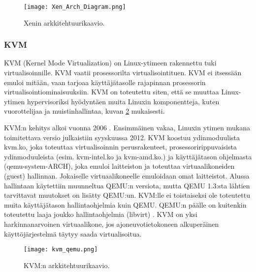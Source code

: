 
\begin{figure}[H]
\centering
\texttt{[image: Xen\_Arch\_Diagram.png]}
\caption{Xenin arkkitehtuurikaavio\cite{xen_overview}.}
\label{kuva_xen}
\end{figure}

\subsubsection{KVM}
KVM (Kernel Mode Virtualization) on Linux-ytimeen rakennettu tuki virtualisoinnille. KVM vaatii prosessorilta virtualisointituen. KVM ei itsessään emuloi mitään, vaan tarjoaa käyttäjätasolle rajapinnan prosessorin virtualisointiominaisuuksiin. KVM on toteutettu siten, että se muuttaa Linux-ytimen hypervisoriksi hyödyntäen muita Linuxin komponentteja, kuten vuorottelijaa ja muistinhallintaa, kuvan \ref{kuva_kvm} mukaisesti. \citep{kvm1}

KVM:n kehitys alkoi vuonna 2006 \cite{kvm3}. Ensimmäinen vakaa, Linuxin ytimen mukana toimitettava versio julkaistiin syyskuussa 2012. KVM koostuu ydinmoduulista kvm.ko, joka toteuttaa virtualisoinnin perusrakenteet, prosessoririppuvaisista ydinmoduuleista (esim. kvm-intel.ko ja kvm-amd.ko.) ja käyttäjätason ohjelmasta (qemu-system-ARCH), joka emuloi laitteiston ja toteuttaa virtuaalikoneiden (guest) hallinnan. Jokaiselle virtuaalikoneelle emuloidaan omat laitteistot. Alussa hallintaan käytettiin muunneltua QEMU:n versiota, mutta QEMU 1.3:sta lähtien tarvittavat muutokset on lisätty QEMU:un. KVM:lle ei toistaiseksi ole toteutettu muita käyttäjätason hallintaohjelmia kuin QEMU. QEMU:n päälle on kuitenkin toteutettu laaja joukko hallintaohjelmia (libvirt) \cite{kvm2}. KVM on yksi harkinnanarvoinen virtuaalikone, jos ajoneuvotietokoneen alkuperäinen käyttöjärjestelmä täytyy saada virtualisoitua.


\begin{figure}[H]
\centering
\texttt{[image: kvm\_qemu.png]}
\caption{KVM:n arkkitehtuurikaavio\cite{kvm4}.}
\label{kuva_kvm}
\end{figure}

